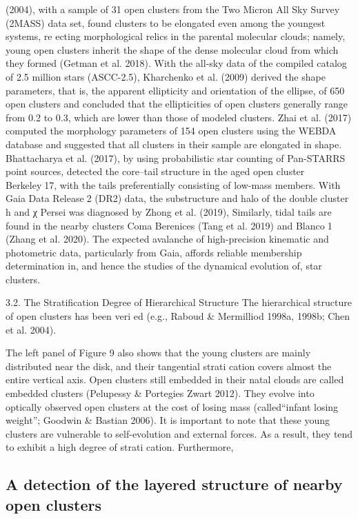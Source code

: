 \documentclass[../main.tex]{subfiles}
\begin{document}
{(2004), with a sample of 31 open clusters from the Two Micron
All Sky Survey (2MASS) data set, found clusters to be elongated
even among the youngest systems, re ecting morphological relics
in the parental molecular clouds; namely, young open clusters
inherit the shape of the dense molecular cloud from which they
formed (Getman et al. 2018). With the all-sky data of the
compiled catalog of 2.5 million stars (ASCC-2.5), Kharchenko
et al. (2009) derived the shape parameters, that is, the apparent
ellipticity and orientation of the ellipse, of 650 open clusters and
concluded that the ellipticities of open clusters generally range
from 0.2 to 0.3, which are lower than those of modeled clusters.
Zhai et al. (2017) computed the morphology parameters of 154
open clusters using the WEBDA database and suggested that all
clusters in their sample are elongated in shape. Bhattacharya et al.
(2017), by using probabilistic star counting of Pan-STARRS point
sources, detected the core–tail structure in the aged open cluster
Berkeley17, with the tails preferentially consisting of low-mass
members. With Gaia Data Release2 (DR2) data, the substructure
and halo of the double cluster h and χ Persei was diagnosed by
Zhong et al. (2019), Similarly, tidal tails are found in the nearby
clusters Coma Berenices (Tang et al. 2019) and Blanco1 (Zhang
et al. 2020). The expected avalanche of high-precision kinematic
and photometric data, particularly from Gaia, affords reliable
membership determination in, and hence the studies of the
dynamical evolution of, star clusters.

3.2. The Stratification Degree of Hierarchical Structure
The hierarchical structure of open clusters has been veri ed
(e.g., Raboud & Mermilliod 1998a, 1998b; Chen et al. 2004).

The left panel of Figure 9 also shows that the young clusters
are mainly distributed near the disk, and their tangential
strati cation covers almost the entire vertical axis. Open
clusters still embedded in their natal clouds are called
embedded clusters (Pelupessy & Portegies Zwart 2012). They
evolve into optically observed open clusters at the cost of
losing mass (called“infant losing weight”; Goodwin & Bastian 2006). It is important to note that these young clusters
are vulnerable to self-evolution and external forces. As a result,
they tend to exhibit a high degree of strati cation. Furthermore,

\subsection{A detection of the layered structure of nearby open clusters}

}
\end{document}
